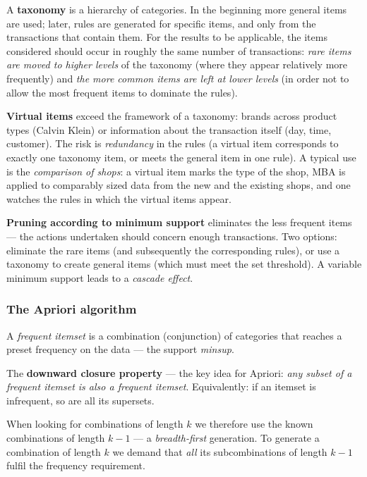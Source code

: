 \documentclass[11pt,a4paper]{article}
\theoremstyle{definition}
\begin{document}
A \textbf{taxonomy} is a hierarchy of categories. In the beginning more general items are used;
later, rules are generated for specific items, and only from the transactions that contain them.
For the results to be applicable, the items considered should occur in roughly the same number of
transactions: \emph{rare items are moved to higher levels} of the taxonomy (where they appear
relatively more frequently) and \emph{the more common items are left at lower levels} (in order
not to allow the most frequent items to dominate the rules).

\textbf{Virtual items} exceed the framework of a taxonomy: brands across product types (Calvin
Klein) or information about the transaction itself (day, time, customer). The risk is
\emph{redundancy} in the rules (a virtual item corresponds to exactly one taxonomy item, or
meets the general item in one rule). A typical use is the \emph{comparison of shops}: a virtual
item marks the type of the shop, MBA is applied to comparably sized data from the new and the
existing shops, and one watches the rules in which the virtual items appear.

\textbf{Pruning according to minimum support} eliminates the less frequent items --- the actions
undertaken should concern enough transactions. Two options: eliminate the rare items (and
subsequently the corresponding rules), or use a taxonomy to create general items (which must meet
the set threshold). A variable minimum support leads to a \emph{cascade effect}.

\subsubsection{The Apriori algorithm}

\begin{defbox}
A \emph{frequent itemset} is a combination (conjunction) of categories that reaches a preset
frequency on the data --- the support \emph{minsup}.

The \textbf{downward closure property} --- the key idea for Apriori: \emph{any subset of a
frequent itemset is also a frequent itemset}. Equivalently: if an itemset is infrequent, so are
all its supersets.

When looking for combinations of length $k$ we therefore use the known combinations of length
$k-1$ --- a \emph{breadth-first} generation. To generate a combination of length $k$ we demand
that \emph{all} its subcombinations of length $k-1$ fulfil the frequency requirement.
\end{defbox}
\end{document}
